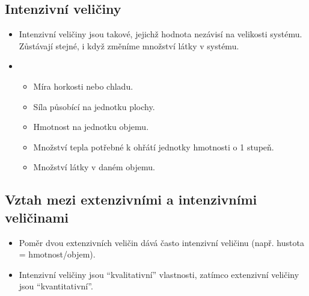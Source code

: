 \documentclass[letterpaper,10pt,english]{jupyterBook}
\begin{document}
\subsection{Intenzivní veličiny}
\label{\detokenize{Prednasky/0_2_Skal_xe1ry_a_vektory:intenzivni-veliciny}}\begin{itemize}
\item {} 
\sphinxAtStartPar
{} Intenzivní veličiny jsou takové, jejichž hodnota nezávisí na velikosti systému. Zůstávají stejné, i když změníme množství látky v systému.

\item {} 
\sphinxAtStartPar
{}
\begin{itemize}
\item {} 
\sphinxAtStartPar
{} Míra horkosti nebo chladu.

\item {} 
\sphinxAtStartPar
{} Síla působící na jednotku plochy.

\item {} 
\sphinxAtStartPar
{} Hmotnost na jednotku objemu.

\item {} 
\sphinxAtStartPar
{} Množství tepla potřebné k ohřátí jednotky hmotnosti o 1 stupeň.

\item {} 
\sphinxAtStartPar
{} Množství látky v daném objemu.

\end{itemize}

\end{itemize}


\subsection{Vztah mezi extenzivními a intenzivními veličinami}
\label{\detokenize{Prednasky/0_2_Skal_xe1ry_a_vektory:vztah-mezi-extenzivnimi-a-intenzivnimi-velicinami}}\begin{itemize}
\item {} 
\sphinxAtStartPar
Poměr dvou extenzivních veličin dává často intenzivní veličinu (např. hustota = hmotnost/objem).

\item {} 
\sphinxAtStartPar
Intenzivní veličiny jsou “kvalitativní” vlastnosti, zatímco extenzivní veličiny jsou “kvantitativní”.

\end{itemize}
\end{document}
